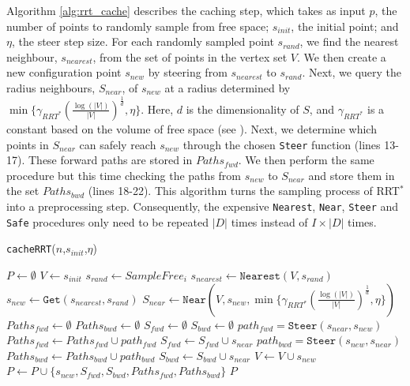 \documentclass{article}  %
\begin{document}
Algorithm \ref{alg:rrt_cache} describes the caching step, which takes as input $p$, the number of points to randomly sample from free space; $s_{init}$, the initial point; and $\eta$, the steer step size. For each randomly sampled point $s_{rand}$, we find the nearest neighbour, $s_{nearest}$, from the set of points in the vertex set $V$. We then create a new configuration point $s_{new}$ by steering from $s_{nearest}$ to $s_{rand}$. Next, we query the radius neighbours, $S_{near}$, of $s_{new}$ at a radius determined by  $\min\{\gamma_{RRT^*}(\frac{\log(|V|)}{|V|})^{\frac{1}{d}},\eta\}$. Here, $d$ is the dimensionality of $S$, and $\gamma_{RRT^*}$ is a constant based on the volume of free space (see \cite{karaman2011sampling}).  Next, we determine which points in $S_{near}$ can safely reach $s_{new}$ through the chosen \texttt{Steer} function (lines 13-17). These forward paths are stored in $Paths_{fwd}$. We then perform the same procedure but this time checking the paths from $s_{new}$ to $S_{near}$ and store them in the set $Paths_{bwd}$ (lines 18-22). This algorithm turns the sampling process of RRT$^*$  into a preprocessing step. Consequently, the expensive \texttt{Nearest}, \texttt{Near}, \texttt{Steer} and \texttt{Safe} procedures only need to be repeated $|D|$ times instead of $I\times|D|$ times.


	\begin{algorithm}

 	\scriptsize
	\caption{\small \texttt{cacheRRT}($n$,$s_{init}$,$\eta$)}
	\label{alg:rrt_cache}
	\begin{algorithmic}[1]
	\STATE $P \gets \emptyset$ \hfill {}
	\STATE $V \gets {s_{init}}$
	\STATE $s_{rand} \gets SampleFree_i$
	\STATE $s_{nearest} \gets \texttt{Nearest}(V,s_{rand})$
	\STATE $s_{new} \gets \texttt{Get}(s_{nearest},s_{rand})$
	\STATE $S_{near} \gets \texttt{Near}(V,{s_{new}},\min\{\gamma_{RRT^*}(\frac{\log(|V|)}{|V|})^{\frac{1}{d}},\eta\})$
	\STATE $Paths_{fwd} \gets \emptyset$
	\STATE $Paths_{bwd} \gets \emptyset$
	\STATE $S_{fwd} \gets \emptyset$
	\STATE $S_{bwd} \gets \emptyset$
	\STATE $path_{fwd} = \texttt{Steer}(s_{near},s_{new})$
	\STATE $Paths_{fwd} \gets Paths_{fwd} \cup path_{fwd}$
	\STATE $S_{fwd} \gets S_{fwd} \cup s_{near}$
	\ENDIF
	\STATE $path_{bwd} = \texttt{Steer}(s_{new},s_{near})$
	\STATE $Paths_{bwd} \gets Paths_{bwd} \cup path_{bwd}$
	\STATE $S_{bwd} \gets S_{bwd} \cup s_{near}$
	\ENDIF
	\ENDFOR
	\STATE $V\gets V \cup s_{new}$
	\STATE $P \gets P \cup \{s_{new},S_{fwd},S_{bwd},Paths_{fwd},Paths_{bwd}\}$
	\ENDFOR
	\RETURN $P$
	\end{algorithmic}

	\end{algorithm}
\end{document}
